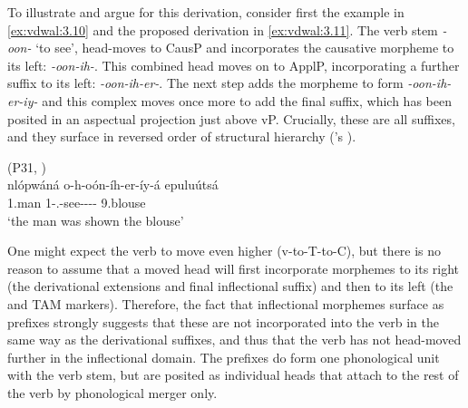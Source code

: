 \documentclass[output=paper]{langsci/langscibook}
\begin{document}
To illustrate and argue for this derivation, consider first the 
example in \eqref{ex:vdwal:3.10} and the proposed derivation in
\eqref{ex:vdwal:3.11}. The verb stem \emph{-oon-} ‘to see’, head-moves to CausP
and incorporates the causative morpheme to its left: \emph{-oon-ih-}. This
combined head moves on to ApplP, incorporating a further suffix to its left:
\emph{-oon-ih-er-}. The next step adds the  morpheme to form
\emph{-oon-ih-er-iy-} and this complex moves once more to add the final suffix,
which has been posited in an aspectual projection just above vP. Crucially,
these are all suffixes, and they surface in reversed order of structural
hierarchy (\citeauthor{Baker1988}'s \citeyear{Baker1988} ).

\ea\label{ex:vdwal:3.10}  (P31, \citealt[168--169]{vanderWal2009})\\
    \gll  nlópwáná  o-h-oón-íh-er-íy-á  epuluútsá\\
        1.man  1\Sm-\Pfv{}.\Dj{}-see-\Caus{}-\Appl{}-\Pass{}-\Fv{}  9.blouse\\
    \glt    ‘the man was shown the blouse’
\z

\ea\label{ex:vdwal:3.11}
\z
{}

One might expect the verb to move even higher (v-to-T-to-C), but there is no
reason to assume that a moved head will first incorporate morphemes to its
right (the derivational extensions and final inflectional suffix) and then to
its left (the  and \gls{TAM} markers). Therefore, the fact that
inflectional morphemes surface as prefixes strongly suggests that these are not
incorporated into the verb in the same way as the derivational suffixes, and
thus that the verb has not head-moved further in the inflectional domain. The
prefixes do form one phonological unit with the verb stem, but are posited as
individual heads that attach to the rest of the verb by phonological merger
only.
\end{document}
